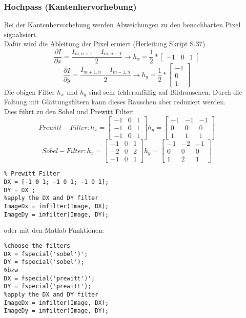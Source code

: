 \subsubsection{Hochpass (Kantenhervorhebung)}
Bei der Kantenhervorhebung werden Abweichungen zu den benachbarten Pixel signalisiert.\\
Dafür wird die Ableitung der Pixel eruiert (Herleitung Skript S.37).
\begin{equation}
\frac{\partial I}{\partial x}=\frac{I_{m,n+1}-I_{m,n-1}}{2} \to h_x = \frac{1}{2}*
\begin{bmatrix}
-1 & 0 & 1
\end{bmatrix}
\end{equation}
\begin{equation}
\frac{\partial I}{\partial y}=\frac{I_{m+1,n}-I_{m-1,n}}{2} \to h_y = \frac{1}{2}*
\begin{bmatrix}
-1 \\
0 \\
1
\end{bmatrix}
\end{equation}
Die obigen Filter $h_x$ und $h_y$ sind sehr fehleranfällig auf Bildrauschen. Durch die Faltung mit Glättungsfiltern kann dieses Rauschen aber reduziert werden.\\
Dies führt zu den Sobel und Prewitt Filter:
\begin{equation*}
Prewitt-Filter: h_x = \begin{bmatrix}
-1 & 0 & 1 \\
-1 & 0 & 1 \\
-1 & 0 & 1
\end{bmatrix}
h_y = \begin{bmatrix}
-1 & -1 & -1 \\
0 & 0 & 0 \\
1 & 1 & 1
\end{bmatrix}
\end{equation*}
\begin{equation*}
Sobel-Filter: h_x = \begin{bmatrix}
-1 & 0 & 1 \\
-2 & 0 & 2 \\
-1 & 0 & 1
\end{bmatrix}
h_y = \begin{bmatrix}
-1 & -2 & -1 \\
0 & 0 & 0 \\
1 & 2 & 1
\end{bmatrix}
\end{equation*}
\begin{lstlisting}
% Prewitt Filter
DX = [-1 0 1; -1 0 1; -1 0 1];
DY = DX';	
%apply the DX and DY filter
ImageDx = imfilter(Image, DX);
ImageDy = imfilter(Image, DY);
\end{lstlisting}
oder mit den Matlab Funktionen:
\begin{lstlisting}
%choose the filters
DX = fspecial('sobel')';
DY = fspecial('sobel');
%bzw
DX = fspecial('prewitt')';
DY = fspecial('prewitt');
%apply the DX and DY filter
ImageDx = imfilter(Image, DX);
ImageDy = imfilter(Image, DY);
\end{lstlisting}
